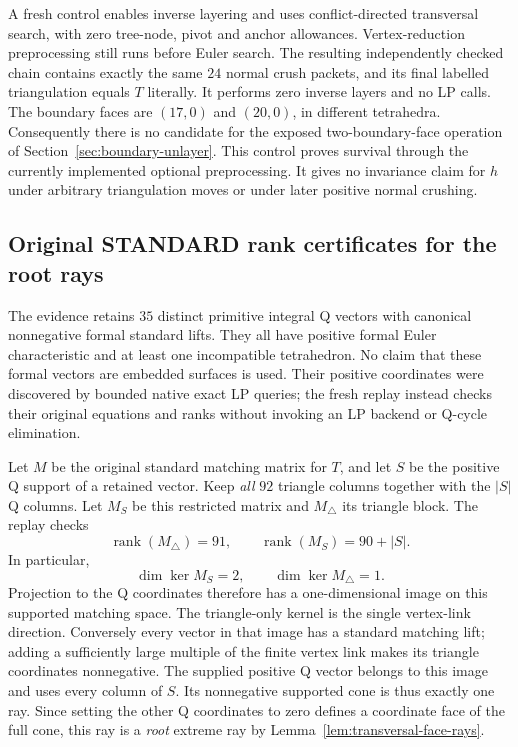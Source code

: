 A fresh control enables inverse layering and uses conflict-directed
transversal search, with zero tree-node, pivot and anchor allowances.
Vertex-reduction preprocessing still runs
before Euler search.  The resulting independently checked
 chain contains exactly the same $24$ normal
crush packets, and its final labelled triangulation equals $T$ literally.
It performs zero inverse layers and no LP calls.  The boundary faces are
$(17,0)$ and $(20,0)$, in different tetrahedra.  Consequently there is no
candidate for the exposed two-boundary-face operation of
Section~\ref{sec:boundary-unlayer}.  This control proves survival through
the currently implemented optional preprocessing.  It gives no
invariance claim for $h$ under arbitrary triangulation moves or under
later positive normal crushing.

\subsection{Original STANDARD rank certificates for the root rays}

The evidence retains $35$ distinct primitive integral Q vectors with
canonical nonnegative formal standard lifts.  They all have positive
formal Euler characteristic and at least one incompatible tetrahedron.
No claim that these formal vectors are embedded surfaces is used.
Their positive coordinates were discovered by bounded native exact LP
queries; the fresh replay instead checks their original equations and
ranks without invoking an LP backend or Q-cycle elimination.

Let $M$ be the original standard matching matrix for $T$, and let $S$
be the positive Q support of a retained vector.  Keep \emph{all} $92$
triangle columns together with the $|S|$ Q columns.  Let $M_S$ be this
restricted matrix and $M_\triangle$ its triangle block.  The replay
checks
\[
 \operatorname{rank}(M_\triangle)=91,\qquad
 \operatorname{rank}(M_S)=90+|S|.
\]
In particular,
\[
 \dim\ker M_S=2,\qquad \dim\ker M_\triangle=1.
\]
Projection to the Q coordinates therefore has a one-dimensional image
on this supported matching space.  The triangle-only kernel is the
single vertex-link direction.  Conversely every vector in that image
has a standard matching lift; adding a sufficiently large multiple of
the finite vertex link makes its triangle coordinates nonnegative.
The supplied positive Q vector belongs to this image and uses every
column of $S$.  Its nonnegative supported cone is thus exactly one ray.
Since setting the other Q coordinates to zero defines a coordinate
face of the full cone, this ray is a \emph{root} extreme ray by
Lemma~\ref{lem:transversal-face-rays}.


